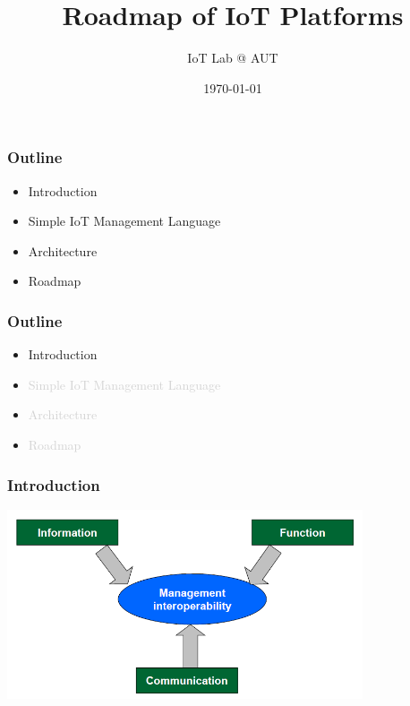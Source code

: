 \documentclass{beamer}
\title[CoAP middle server for IoT platform]{Roadmap of IoT Platforms}
\author{IoT Lab @ AUT}
\institute[] {
  Amirkabir University of Technology
}
\date{\today}
\begin{document}
\begin{frame}
\titlepage
\end{frame}


\begin{frame}
	\frametitle{Outline}
	\vspace{.1cm}
	\begin{itemize}
		\justifying
		\item Introduction
		\item Simple IoT Management Language
		\item Architecture
		\item Roadmap
	\end{itemize}
\end{frame}

\begin{frame}
	\frametitle{Outline}
	\vspace{.1cm}
	\begin{itemize}
		\justifying
		\item Introduction
		\item \textcolor{LightGray}{Simple IoT Management Language}
		\item \textcolor{LightGray}{Architecture}
		\item \textcolor{LightGray}{Roadmap}
	\end{itemize}
\end{frame}

\begin{frame}
	\frametitle{Introduction}
	\vspace{.1cm}
	\hspace*{.75cm} \includegraphics[width=10.5cm]{figs/pic1.png}
\end{frame}
\end{document}
